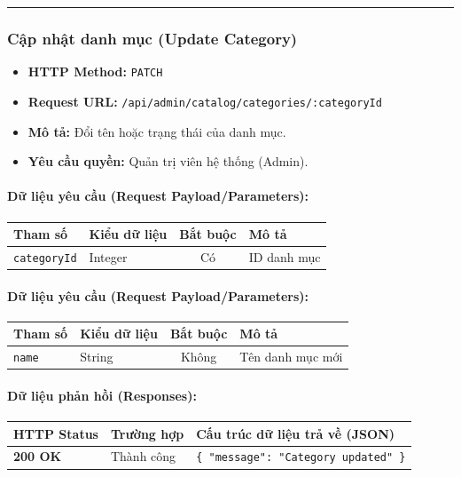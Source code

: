\documentclass[12pt,a4paper]{article}
\begin{document}
\vskip 0.4cm
\noindent\rule{\textwidth}{0.3pt}
\vskip 0.4cm

\subsubsection{Cập nhật danh mục (Update Category)}
\begin{itemize}[leftmargin=*]
    \item \textbf{HTTP Method:} \texttt{PATCH}
    \item \textbf{Request URL:} \texttt{/api/admin/catalog/categories/:categoryId}
    \item \textbf{Mô tả:} Đổi tên hoặc trạng thái của danh mục.
    \item \textbf{Yêu cầu quyền:} Quản trị viên hệ thống (Admin).
\end{itemize}

\paragraph{Dữ liệu yêu cầu (Request Payload/Parameters):}
\begin{longtable}{|p{2.8cm}|p{2.2cm}|c|p{7.0cm}|}
\hline
\textbf{Tham số} & \textbf{Kiểu dữ liệu} & \textbf{Bắt buộc} & \textbf{Mô tả} \\ \hline
\endhead
\texttt{categoryId} & Integer & Có & ID danh mục \\ \hline
\end{longtable}

\paragraph{Dữ liệu yêu cầu (Request Payload/Parameters):}
\begin{longtable}{|p{2.8cm}|p{2.2cm}|c|p{7.0cm}|}
\hline
\textbf{Tham số} & \textbf{Kiểu dữ liệu} & \textbf{Bắt buộc} & \textbf{Mô tả} \\ \hline
\endhead
\texttt{name} & String & Không & Tên danh mục mới \\ \hline
\end{longtable}

\paragraph{Dữ liệu phản hồi (Responses):}
\begin{longtable}{|p{2.8cm}|p{3.2cm}|p{8.0cm}|}
\hline
\textbf{HTTP Status} & \textbf{Trường hợp} & \textbf{Cấu trúc dữ liệu trả về (JSON)} \\ \hline
\endhead
\textbf{200 OK} & Thành công & \texttt{\{ "message": "Category updated" \}} \\ \hline
\end{longtable}
\end{document}

